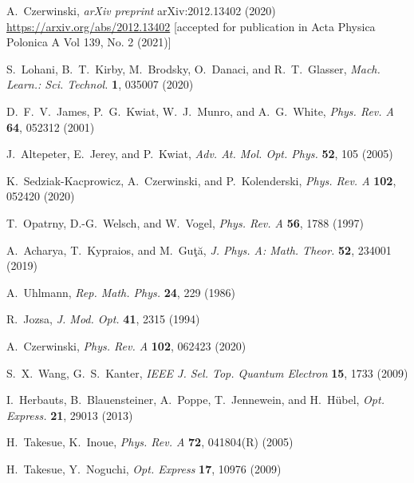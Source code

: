 \documentclass[aps,pra,reprint,groupedaddress,showkeys]{revtex4-1}
\begin{document}
\begin{thebibliography}{1}
A.~Czerwinski, \textit{arXiv preprint} arXiv:2012.13402 (2020)  \url{https://arxiv.org/abs/2012.13402} [accepted for publication in Acta Physica Polonica A Vol 139, No. 2 (2021)]

S.~Lohani, B.~T.~Kirby, M.~Brodsky, O.~Danaci, and R.~T.~Glasser, \textit{Mach. Learn.: Sci. Technol.} \textbf{1}, 035007 (2020) 

D.~F.~V.~James, P.~G.~Kwiat, W.~J.~Munro, and A.~G.~White, \textit{Phys. Rev. A} \textbf{64}, 052312 (2001)  

J.~Altepeter, E.~Jerey, and P.~Kwiat, \textit{Adv. At. Mol. Opt. Phys.} \textbf{52}, 105 (2005) 

K.~Sedziak-Kacprowicz, A.~Czerwinski, and P.~Kolenderski, \textit{Phys. Rev. A} \textbf{102}, 052420 (2020) 

T.~Opatrny, D.-G.~Welsch, and W.~Vogel, \textit{Phys. Rev. A} \textbf{56}, 1788 (1997) 

A.~Acharya, T.~Kypraios, and M.~Gu{\c{t}}{\u{a}}, \textit{J. Phys. A: Math. Theor.} \textbf{52}, 234001 (2019) 

A.~Uhlmann, \textit{Rep. Math. Phys.} \textbf{24}, 229 (1986) 

R.~Jozsa, \textit{J. Mod. Opt.} \textbf{41}, 2315 (1994) 

A.~Czerwinski, \textit{Phys. Rev. A} \textbf{102}, 062423 (2020) 

S.~X.~Wang, G.~S.~Kanter, \textit{IEEE J. Sel. Top. Quantum Electron} \textbf{15}, 1733 (2009) 

I.~Herbauts, B.~Blauensteiner, A.~Poppe, T.~Jennewein, and H.~H\"ubel, \textit{Opt. Express.} \textbf{21}, 29013 (2013) 

H.~Takesue, K.~Inoue, \textit{Phys. Rev. A} \textbf{72}, 041804(R) (2005) 

H.~Takesue, Y.~Noguchi, \textit{Opt. Express} \textbf{17}, 10976 (2009) 


\end{thebibliography}
\end{document}
